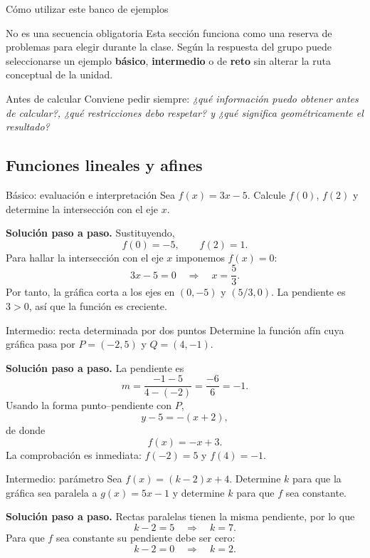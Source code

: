 \documentclass[aspectratio=169,10pt]{beamer}
\begin{document}
\begin{frame}{Cómo utilizar este banco de ejemplos}
\begin{block}{No es una secuencia obligatoria}
Esta sección funciona como una reserva de problemas para elegir durante la clase. Según la respuesta del grupo puede seleccionarse un ejemplo \textbf{básico}, \textbf{intermedio} o de \textbf{reto} sin alterar la ruta conceptual de la unidad.
\end{block}
\begin{alertblock}{Antes de calcular}
Conviene pedir siempre: \emph{¿qué información puedo obtener antes de calcular?, ¿qué restricciones debo respetar? y ¿qué significa geométricamente el resultado?}
\end{alertblock}
\end{frame}

\subsection{Funciones lineales y afines}

\begin{frame}{Básico: evaluación e interpretación}
Sea $f(x)=3x-5$. Calcule $f(0)$, $f(2)$ y determine la intersección con el eje $x$.

\textbf{Solución paso a paso.} Sustituyendo,
\[
f(0)=-5,\qquad f(2)=1.
\]
Para hallar la intersección con el eje $x$ imponemos $f(x)=0$:
\[
3x-5=0\quad\Longrightarrow\quad x=\frac53.
\]
Por tanto, la gráfica corta a los ejes en $(0,-5)$ y $(5/3,0)$. La pendiente es $3>0$, así que la función es creciente.
\end{frame}

\begin{frame}{Intermedio: recta determinada por dos puntos}
Determine la función afín cuya gráfica pasa por $P=(-2,5)$ y $Q=(4,-1)$.

\textbf{Solución paso a paso.} La pendiente es
\[
m=\frac{-1-5}{4-(-2)}=\frac{-6}{6}=-1.
\]
Usando la forma punto--pendiente con $P$,
\[
y-5=-(x+2),
\]
de donde
\[
\boxed{f(x)=-x+3}.
\]
La comprobación es inmediata: $f(-2)=5$ y $f(4)=-1$.
\end{frame}

\begin{frame}{Intermedio: parámetro}
Sea $f(x)=(k-2)x+4$. Determine $k$ para que la gráfica sea paralela a $g(x)=5x-1$ y determine $k$ para que $f$ sea constante.

\textbf{Solución paso a paso.} Rectas paralelas tienen la misma pendiente, por lo que
\[
k-2=5\quad\Longrightarrow\quad \boxed{k=7}.
\]
Para que $f$ sea constante su pendiente debe ser cero:
\[
k-2=0\quad\Longrightarrow\quad \boxed{k=2}.
\]
\end{frame}
\end{document}
